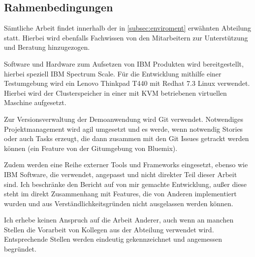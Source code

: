 \subsection{Rahmenbedingungen}

Sämtliche Arbeit findet innerhalb der in \autoref{subsec:enviroment} erwähnten Abteilung statt. Hierbei wird ebenfalls Fachwissen von den Mitarbeitern zur Unterstützung und Beratung hinzugezogen.

Software und Hardware zum Aufsetzen von IBM Produkten wird bereitgestellt, hierbei speziell IBM Spectrum Scale. Für die Entwicklung mithilfe einer Testumgebung wird ein Lenovo Thinkpad T440 mit Redhat 7.3 Linux verwendet. Hierbei wird der Clusterspeicher in einer mit KVM betriebenen virtuellen Maschine aufgesetzt.

Zur Versionsverwaltung der Demoanwendung wird \gls{Git} verwendet. Notwendiges Projektmanagement wird agil umgesetzt und es werde, wenn notwendig Stories oder auch Tasks erzeugt, die dann zusammen mit den Git Issues getrackt werden können (ein Feature von der Gitumgebung von Bluemix).

Zudem werden eine Reihe externer Tools und Frameworks eingesetzt, ebenso wie IBM Software, die verwendet, angepasst und nicht direkter Teil dieser Arbeit sind. Ich beschränke den Bericht auf von mir gemachte Entwicklung, außer diese steht im direkt Zusammenhang mit Features, die von Anderen implementiert wurden und aus Verständlichkeitsgründen nicht ausgelassen werden können.

Ich erhebe keinen Anspruch auf die Arbeit Anderer, auch wenn an manchen Stellen die Vorarbeit von Kollegen aus der Abteilung verwendet wird. Entsprechende Stellen werden eindeutig gekennzeichnet und angemessen begründet.